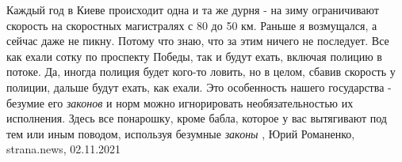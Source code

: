 Каждый год в Киеве происходит одна и та же дурня - на зиму ограничивают
скорость на скоростных магистралях с 80 до 50 км. Раньше я возмущался, а сейчас
даже не пикну. Потому что знаю, что за этим ничего не последует. Все как ехали
сотку по проспекту Победы, так и будут ехать, включая полицию в потоке. Да,
иногда полиция будет кого-то ловить, но в целом, сбавив скорость у полиции,
дальше будут ехать, как ехали.  Это особенность нашего государства - безумие
его \emph{законов} и норм можно игнорировать необязательностью их исполнения. Здесь
все понарошку, кроме бабла, которое у вас вытягивают под тем или иным поводом,
используя безумные \emph{законы}
, 
Юрий Романенко, strana.news, 02.11.2021
